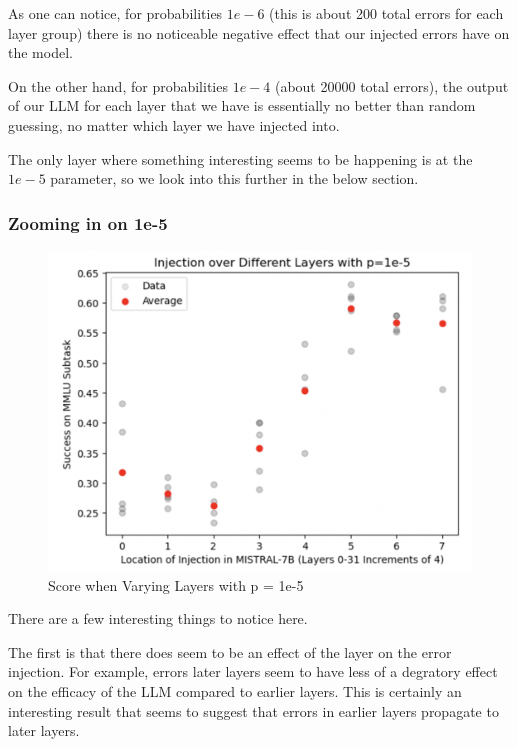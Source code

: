 As one can notice, for probabilities $1e-6$ (this is about 200 total errors for each layer group) there is no noticeable negative effect that our injected errors have on the model.

On the other hand, for probabilities $1e-4$ (about 20000 total errors), the output of our LLM for each layer that we have is essentially no better than random guessing, no matter which layer we have injected into.

The only layer where something interesting seems to be happening is at the $1e-5$ parameter, so we look into this further in the below section.

\subsubsection{Zooming in on 1e-5}

\begin{figure}[!htbp]
    \centering
    \includegraphics[width=1.0\linewidth]{images/varylayer.png}
    \caption{Score when Varying Layers with p = 1e-5}
    \label{fig:varylayer}
\end{figure}

There are a few interesting things to notice here.

The first is that there does seem to be an effect of the layer on the error injection. For example, errors later layers seem to have less of a degratory effect on the efficacy of the LLM compared to earlier layers.
This is certainly an interesting result that seems to suggest that errors in earlier layers propagate to later layers.

